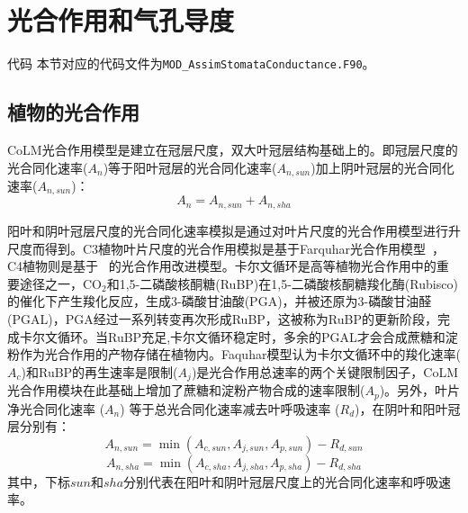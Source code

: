 \chapter{光合作用和气孔导度}
\begin{mymdframed}{代码}
本节对应的代码文件为\texttt{MOD\_AssimStomataConductance.F90}。
\end{mymdframed}


\section{植物的光合作用}\label{植物的光合作用}
CoLM光合作用模型是建立在冠层尺度，双大叶冠层结构基础上的。即冠层尺度的光合同化速率($A_{n}$)等于阳叶冠层的光合同化速率($A_{n,sun}$)加上阴叶冠层的光合同化速率($A_{n,sun}$)：
\begin{equation}\label{Ansun_Ansha}
A_{n}=A_{n,sun}+A_{n,sha}
\end{equation}

阳叶和阴叶冠层尺度的光合同化速率模拟是通过对叶片尺度的光合作用模型进行升尺度而得到。C3植物叶片尺度的光合作用模拟是基于Farquhar光合作用模型~\citep{farquhar1980biochemical}，
C4植物则是基于~\citet{collatz1992} 的光合作用改进模型。卡尔文循环是高等植物光合作用中的重要途径之一，CO$_2$和1,5-二磷酸核酮糖(RuBP)在1,5-二磷酸核酮糖羧化酶(Rubisco)的催化下产生羧化反应，生成3-磷酸甘油酸(PGA)，并被还原为3-磷酸甘油醛(PGAL)，PGA经过一系列转变再次形成RuBP，这被称为RuBP的更新阶段，完成卡尔文循环。当RuBP充足,卡尔文循环稳定时，多余的PGAL才会合成蔗糖和淀粉作为光合作用的产物存储在植物内。Faquhar模型认为卡尔文循环中的羧化速率($A_{c}$)和RuBP的再生速率是限制($A_{j}$)是光合作用总速率的两个关键限制因子，CoLM光合作用模块在此基础上增加了蔗糖和淀粉产物合成的速率限制($A_{p}$)。另外，叶片净光合同化速率 ($A_{n}$) 等于总光合同化速率减去叶呼吸速率 ($R_d$)，在阴叶和阳叶冠层分别有：
\begin{equation}\label{An1sun}
A_{n,sun}=\min \left(A_{c,sun}, A_{j,sun}, A_{p,sun}\right)-R_{d,sun}
\end{equation}
\begin{equation}\label{An1sha}
A_{n,sha}=\min \left(A_{c,sha}, A_{j,sha}, A_{p,sha}\right)-R_{d,sha}
\end{equation}
其中，下标$sun$和$sha$分别代表在阳叶和阴叶冠层尺度上的光合同化速率和呼吸速率。


